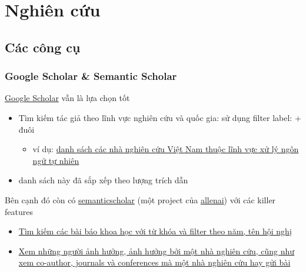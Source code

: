 \chapter{Nghiên cứu}


\section{Các công cụ}

\subsection{Google Scholar \& Semantic Scholar}

\href{https://scholar.google.com.vn/}{Google Scholar} vẫn là lựa chọn tốt

\begin{itemize}
  \item Tìm kiếm tác giả theo lĩnh vực nghiên cứu và quốc gia: sử dụng filter label: + đuôi
    \begin{itemize}
      \item ví dụ: \href{https://scholar.google.com.vn/citations?hl=en&amp;view_op=search_authors&amp;mauthors=label\%3Anatural_language_processing+.vn&amp;btnG=}{danh sách các nhà nghiên cứu Việt Nam thuộc lĩnh vực xử lý ngôn ngữ tự nhiên}
    \end{itemize}
  \item danh sách này đã sắp xếp theo lượng trích dẫn
\end{itemize}


Bên cạnh đó còn có \href{https://www.semanticscholar.org/}{semanticscholar} (một project của \href{http://allenai.org/}{allenai}) với các killer features

\begin{itemize}
  \item \href{https://www.semanticscholar.org/search?venue\%5B\%5D=ACL&amp;q=sentiment&amp;sort=relevance}{Tìm kiếm các bài báo khoa học với từ khóa và filter theo năm, tên hội nghị}
  \item \href{https://www.semanticscholar.org/author/Christopher-D-Manning/1812612}{Xem những người ảnh hưởng, ảnh hưởng bởi một nhà nghiên cứu, cũng như xem co-author, journals và conferences mà một nhà nghiên cứu hay gửi bài}
\end{itemize}

